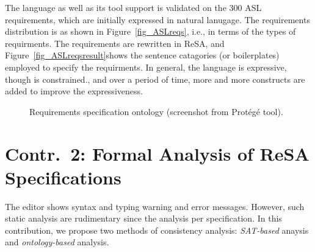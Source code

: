 The language as well as its tool support is validated on the 300 ASL requirements, which are initially expressed in natural lanugage. The requirements distribution is as shown in Figure~\ref{fig_ASLreqs}, i.e., in terms of the types of requirments. The requirements are rewritten in ReSA, and Figure~\ref{fig_ASLreqsresult}shows the sentence catagories (or boilerplates) employed to specify the requirments. In general, the language is expressive,  though is constrained., and over a period of time, more and more constructs are added to improve the expressiveness.
 \begin{figure}[h] 
 	\centering
 	 \hfill
 	\caption{Requirements specification ontology (screenshot from Prot\'eg\'e tool).} \label{fig_ontology}
 \end{figure}
\section{Contr.~2: {Formal Analysis of ReSA Specifications}}\label{rc_resaanalysis}
The editor shows syntax and typing warning and error messages. However, such static analysis are rudimentary since the analysis per specification. In this contribution, we propose two methods of consistency analysis: \textit{SAT-based} anaysis and \textit{ontology-based} analysis. 

